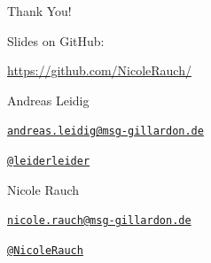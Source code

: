 {
\begin{frame}{Thank You!}

        Slides on GitHub:
        \vspace{-0.8em}
        \begin{center}
                \url{https://github.com/NicoleRauch/}
        \end{center}

     \begin{block}{Andreas Leidig}
        \begin{description}[Twitterxx]
                \item[E-Mail]  \href{mailto:andreas.leidig@msg-gillardon.de}{\texttt{andreas.leidig@msg-gillardon.de}}
                \item[Twitter] \href{http://twitter.com/leiderleider}{\texttt{@leiderleider}}
        \end{description}
      \end{block}
      \begin{block}{Nicole Rauch}
        \begin{description}[Twitterxx]
                \item[E-Mail]  \href{mailto:nicole.rauch@msg-gillardon.de}{\texttt{nicole.rauch@msg-gillardon.de}}
                \item[Twitter] \href{http://twitter.com/NicoleRauch}{\texttt{@NicoleRauch}}
        \end{description}
        \end{block}
\end{frame}
}
